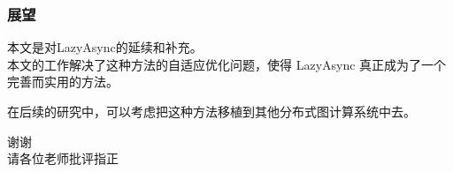 \documentclass[10pt]{beamer}
\begin{document}
\begin{frame}%
  \frametitle{展望}
  本文是对LazyAsync的延续和补充。\\
  本文的工作解决了这种方法的自适应优化问题，使得 LazyAsync 真正成为了一个完善而实用的方法。

  在后续的研究中，可以考虑把这种方法移植到其他分布式图计算系统中去。
\end{frame}



\begin{frame}%
  \begin{center}
    \begin{huge}
      谢谢\\[\baselineskip]
      请各位老师批评指正          
    \end{huge}
  \end{center}
\end{frame}
\end{document}
